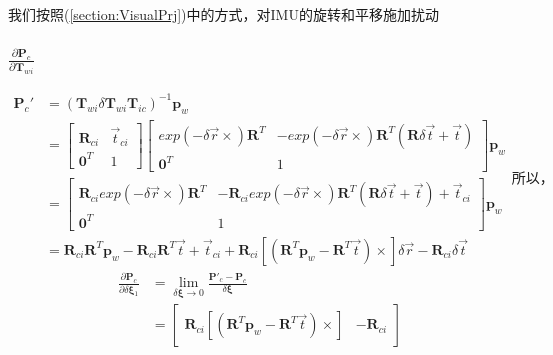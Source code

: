 \documentclass{article}
\begin{document}
我们按照(\ref{section:VisualPrj})中的方式，对IMU的旋转和平移施加扰动
\subsubsection{$\frac{\partial{\boldsymbol{P}_c}}{\partial{\boldsymbol{T}_{wi}}}$}
$$
\begin{aligned}
	\boldsymbol{P}_c' & =(\boldsymbol{T}_{wi}\delta\boldsymbol{T}_{wi}\boldsymbol{T}_{ic})^{-1}\boldsymbol{p}_w \\ & = 
	\left[ 
	\begin{matrix} 
	\boldsymbol{R}_{ci}                                                & \vec{t}_{ci}                                                                   \\ 
	\boldsymbol{0}^T                                                   & 1                                                                              
	\end{matrix}
	\right]
	\left[
	\begin{matrix}
	exp(-\delta{\vec{r}}\times)\boldsymbol{R}^T                        & -exp(-\delta{\vec{r}}\times)\boldsymbol{R}^T(\boldsymbol{R}\delta\vec{t}+\vec{t})\\ 
	\boldsymbol{0}^T                                                   & 1                                                                              
	\end{matrix}
	\right] \boldsymbol{p}_w
	\\&=
	\left[
	\begin{matrix}
	\boldsymbol{R}_{ci}exp(-\delta{\vec{r}} \times) \boldsymbol{R}^T &                                                                                
	-\boldsymbol{R}_{ci}exp(-\delta{\vec{r}} \times) \boldsymbol{R}^T(\boldsymbol{R}\delta\vec{t}+\vec{t})+\vec{t}_{ci}\\
	\boldsymbol{0}^T                                                   & 1                                                                              
	\end{matrix}
	\right]\boldsymbol{p}_w \\& = 
	\boldsymbol{R}_{ci}\boldsymbol{R}^T\boldsymbol{p}_w-\boldsymbol{R}_{ci}\boldsymbol{R}^T\vec{t}+\vec{t}_{ci}+\boldsymbol{R}_{ci}[(\boldsymbol{R}^T\boldsymbol{p}_w-\boldsymbol{R}^T\vec{t})\times]\delta\vec{r}-\boldsymbol{R}_{ci}\delta\vec{t}
\end{aligned}
所以，
$$
\begin{equation}
	\begin{aligned}
		\frac{\partial\boldsymbol{P}_c}{\partial\delta\boldsymbol{\xi}_1}                     & =                    
		\lim_{\delta\boldsymbol{\xi}\rightarrow0} \frac{\boldsymbol{P}'_c-\boldsymbol{P}_c}{\delta\boldsymbol{\xi}}\\&=
		\left[
		\begin{matrix}
		\boldsymbol{R}_{ci}[(\boldsymbol{R}^T\boldsymbol{p}_w-\boldsymbol{R}^T\vec{t})\times] & -\boldsymbol{R}_{ci} 
		\end{matrix}
		\right]
	\end{aligned}
\end{equation} 
\end{document}
